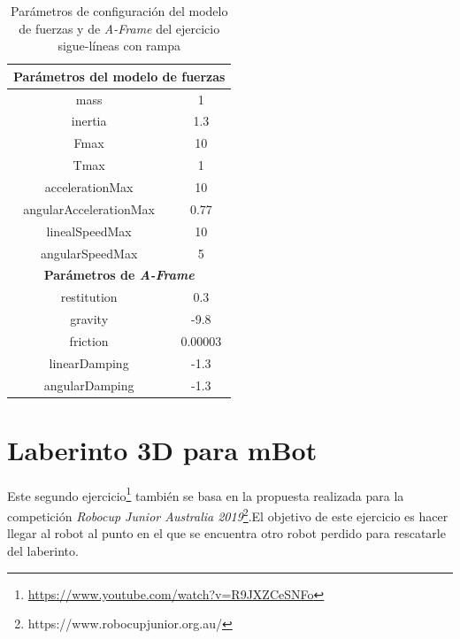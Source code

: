 \begin{table}[h!]
\centering
\begin{tabular}{|c|c|}
\hline
\multicolumn{2}{|c|}{\textbf{Parámetros del modelo de fuerzas}}                \\ \hline
mass                                           & 1                             \\ \hline
inertia                                        & 1.3                           \\ \hline
Fmax                                           & 10                            \\ \hline
Tmax                                           & 1                             \\ \hline
accelerationMax                                & 10                            \\ \hline
angularAccelerationMax                         & 0.77                          \\ \hline
linealSpeedMax                                 & 10                            \\ \hline
angularSpeedMax                                & 5                             \\ \hline
\multicolumn{2}{|c|}{\textbf{Parámetros de \textit{A-Frame}}} \\ \hline
restitution                                    & 0.3                           \\ \hline
gravity                                        & -9.8                          \\ \hline
friction                                       & 0.00003                       \\ \hline
linearDamping                                  & -1.3                          \\ \hline
angularDamping                                 & -1.3                          \\ \hline
\end{tabular}
\caption{Parámetros de configuración del modelo de fuerzas y de \textit{A-Frame} del ejercicio sigue-líneas con rampa}
\label{tabla:param_ej1}
\end{table}

\newpage
\section{Laberinto 3D para mBot}
Este segundo ejercicio\footnote{\url{https://www.youtube.com/watch?v=R9JXZCeSNFo}} también se basa en la propuesta realizada para la competición \textit{Robocup Junior Australia 2019}\footnote{https://www.robocupjunior.org.au/}.El objetivo de este ejercicio es hacer llegar al robot al punto en el que se encuentra otro robot perdido para rescatarle del laberinto. \newline

